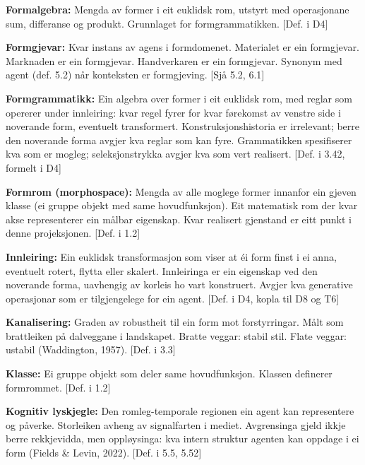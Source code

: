 \documentclass[10pt]{article}
\begin{document}
\textbf{Formalgebra:} Mengda av former i eit euklidsk rom, utstyrt med operasjonane sum, differanse og produkt. Grunnlaget for formgrammatikken. [Def. i D4]




\textbf{Formgjevar:} Kvar instans av agens i formdomenet. Materialet er ein formgjevar. Marknaden er ein formgjevar. Handverkaren er ein formgjevar. Synonym med agent (def. 5.2) når konteksten er formgjeving. [Sjå 5.2, 6.1]




\textbf{Formgrammatikk:} Ein algebra over former i eit euklidsk rom, med reglar som opererer under innleiring: kvar regel fyrer for kvar førekomst av venstre side i noverande form, eventuelt transformert. Konstruksjonshistoria er irrelevant; berre den noverande forma avgjer kva reglar som kan fyre. Grammatikken spesifiserer kva som er mogleg; seleksjonstrykka avgjer kva som vert realisert. [Def. i 3.42, formelt i D4]




\textbf{Formrom (morphospace):} Mengda av alle moglege former innanfor ein gjeven klasse (ei gruppe objekt med same hovudfunksjon). Eit matematisk rom der kvar akse representerer ein målbar eigenskap. Kvar realisert gjenstand er eitt punkt i denne projeksjonen. [Def. i 1.2]




\textbf{Innleiring:} Ein euklidsk transformasjon som viser at éi form finst i ei anna, eventuelt rotert, flytta eller skalert. Innleiringa er ein eigenskap ved den noverande forma, uavhengig av korleis ho vart konstruert. Avgjer kva generative operasjonar som er tilgjengelege for ein agent. [Def. i D4, kopla til D8 og T6]




\textbf{Kanalisering:} Graden av robustheit til ein form mot forstyrringar. Målt som brattleiken på dalveggane i landskapet. Bratte veggar: stabil stil. Flate veggar: ustabil (Waddington, 1957). [Def. i 3.3]




\textbf{Klasse:} Ei gruppe objekt som deler same hovudfunksjon. Klassen definerer formrommet. [Def. i 1.2]




\textbf{Kognitiv lyskjegle:} Den romleg-temporale regionen ein agent kan representere og påverke. Storleiken avheng av signalfarten i mediet. Avgrensinga gjeld ikkje berre rekkjevidda, men oppløysinga: kva intern struktur agenten kan oppdage i ei form (Fields \& Levin, 2022). [Def. i 5.5, 5.52]
\end{document}
